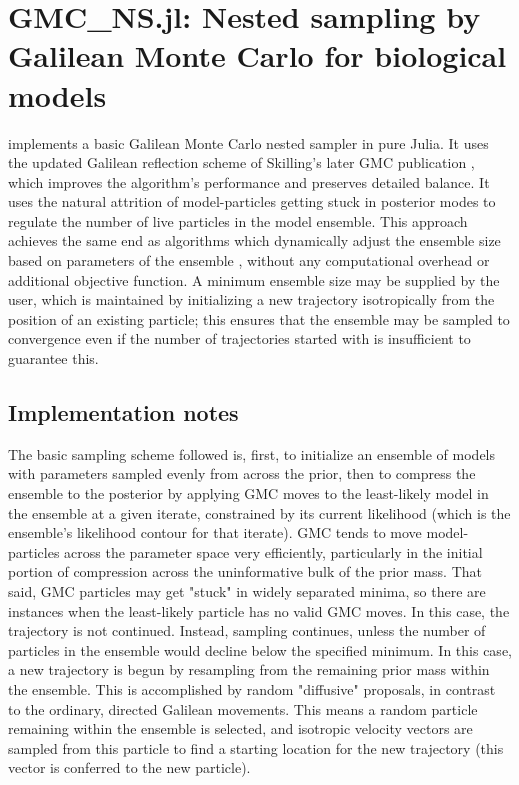 \chapter{GMC\_NS.jl: Nested sampling by Galilean Monte Carlo for biological models}
\label{chap:GMC}
 implements a basic Galilean Monte Carlo nested sampler \cite{Skilling2012,Skilling2019} in pure Julia. It uses the updated Galilean reflection scheme of Skilling's later GMC publication \cite{Skilling2019}, which improves the algorithm's performance and preserves detailed balance. It uses the natural attrition of model-particles getting stuck in posterior modes to regulate the number of live particles in the model ensemble. This approach achieves the same end as algorithms which dynamically adjust the ensemble size based on parameters of the ensemble \cite{Feroz2009,Higson2019}, without any computational overhead or additional objective function. A minimum ensemble size may be supplied by the user, which is maintained by initializing a new trajectory isotropically from the position of an existing particle; this ensures that the ensemble may be sampled to convergence even if the number of trajectories started with is insufficient to guarantee this. 

\section{Implementation notes}

The basic sampling scheme followed is, first, to initialize an ensemble of models with parameters sampled evenly from across the prior, then to compress the ensemble to the posterior by applying GMC moves to the least-likely model in the ensemble at a given iterate, constrained by its current likelihood (which is the ensemble's likelihood contour for that iterate). GMC tends to move model-particles across the parameter space very efficiently, particularly in the initial portion of compression across the uninformative bulk of the prior mass. That said, GMC particles may get "stuck" in widely separated minima, so there are instances when the least-likely particle has no valid GMC moves. In this case, the trajectory is not continued. Instead, sampling continues, unless the number of particles in the ensemble would decline below the specified minimum. In this case, a new trajectory is begun by resampling from the remaining prior mass within the ensemble. This is accomplished by random "diffusive" proposals, in contrast to the ordinary, directed Galilean movements. This means a random particle remaining within the ensemble is selected, and isotropic velocity vectors are sampled from this particle to find a starting location for the new trajectory (this vector is conferred to the new particle).

